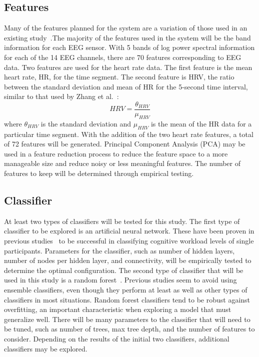 \documentclass[11pt]{article}
\begin{document}
\subsection{Features}
Many of the features planned for the system are a variation of those used in an existing study~\cite{Wilson}.The majority of the features used in the system will be the band information for each EEG sensor. With 5 bands of log power spectral information for each of the 14 EEG channels, there are 70 features corresponding to EEG data. Two features are used for the heart rate data. The first feature is the mean heart rate, HR, for the time segment. The second feature is HRV, the ratio between the standard deviation and mean of HR for the 5-second time interval, similar to that used by Zhang et al.~\cite{Zhang}: \[HRV = \frac{\theta_{HRV}}{\mu_{HRV}}\] where \( \theta_{HRV} \) is the standard deviation and \( \mu_{HRV}\) is the mean of the HR data for a particular time segment. With the addition of the two heart rate features, a total of 72 features will be generated. Principal Component Analysis (PCA) may be used in a feature reduction process to reduce the feature space to a more manageable size and reduce noisy or less meaningful features. The number of features to keep will be determined through empirical testing.

\subsection{Classifier}
At least two types of classifiers will be tested for this study.  The first type of classifier to be explored is an artificial neural network. These have been proven in previous studies~\cite{Wilson} to be successful in classifying cognitive workload levels of single participants. Parameters for the classifier, such as number of hidden layers, number of nodes per hidden layer, and connectivity, will be empirically tested to determine the optimal configuration. The second type of classifier that will be used in this study is a random forest~\cite{Breiman}. Previous studies seem to avoid using ensemble classifiers, even though they perform at least as well as other types of classifiers in most situations. Random forest classifiers tend to be robust against overfitting, an important characteristic when exploring a model that must generalize well. There will be many parameters to the classifier that will need to be tuned, such as number of trees, max tree depth, and the number of features to consider. Depending on the results of the initial two classifiers, additional classifiers may be explored.  
\end{document}
